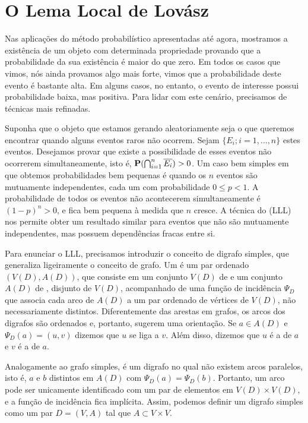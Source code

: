 
\section{O Lema Local de Lovász}


Nas aplicações do método probabilístico apresentadas até agora, mostramos a existência de um objeto com determinada propriedade provando que a probabilidade da sua existência é maior do que zero. Em todos os casos que vimos, nós ainda provamos algo mais forte, vimos que a probabilidade deste evento é bastante alta. Em alguns casos, no entanto, o evento de interesse possui probabilidade baixa, mas positiva. Para lidar com este cenário, precisamos de técnicas mais refinadas.

Suponha que o objeto que estamos gerando aleatoriamente seja o que queremos encontrar quando alguns eventos raros não ocorrem. Sejam $\{E_i; i = 1,\dots,n\}$ estes eventos. Desejamos provar que existe a possibilidade de esses eventos não ocorrerem simultaneamente, isto é,  $\operatorname{\mathbf{P}}(\bigcap_{i=1}^n \overline{E_i}) > 0$. Um caso bem simples em que obtemos probabilidades bem pequenas é quando os $n$ eventos são mutuamente independentes, cada um com probabilidade $0 \leq p<1$. A probabilidade de todos os eventos não acontecerem simultaneamente é $(1-p)^n > 0$, e fica bem pequena à medida que $n$ cresce. A técnica do  (LLL) nos permite obter um resultado similar para eventos que não são mutuamente independentes, mas possuem dependências fracas entre si.

Para enunciar o LLL, precisamos introduzir o conceito de digrafo simples, que generaliza ligeiramente o conceito de grafo. Um  é um par ordenado $(V(D), A(D))$, que consiste em um conjunto $V(D)$ de  e um conjunto $A(D)$ de , disjunto de $V(D)$, acompanhado de uma função de incidência $\Psi_D$ que associa cada arco de $A(D)$ a um par ordenado de vértices de $V(D)$, não necessariamente distintos. Diferentemente das arestas em grafos, os arcos dos digrafos são ordenados e, portanto, sugerem uma orientação. Se $a \in A(D)$ e $\Psi_D(a) = (u,v)$ dizemos que $u$ se liga a $v$. Além disso, dizemos que $u$ é a  de $a$ e $v$ é a  de $a$.

Analogamente ao grafo simples,  é um digrafo no qual não existem arcos paralelos, isto é, $a$ e $b$ distintos em $A(D)$ com $\Psi_D(a) = \Psi_D(b)$. Portanto, um arco pode ser unicamente identificado com um par de elementos em $V(D) \times V(D)$, e a função de incidência fica implícita. Assim, podemos definir um digrafo simples como um par $D = (V,A)$ tal que $A \subset V\times V$.

